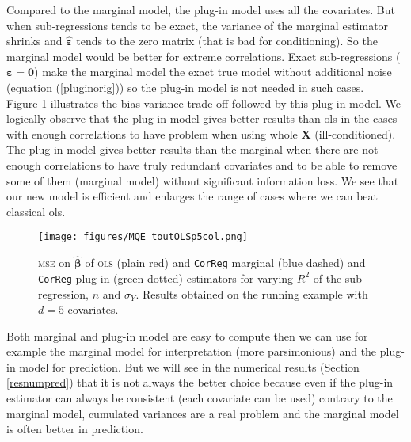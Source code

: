 \documentclass[12pt,a4paper]{report}
\begin{document}
Compared to the marginal model, the plug-in model uses all the covariates. But when sub-regressions tends to be exact, the variance of the marginal estimator shrinks and $ \hat{\boldsymbol{\varepsilon}}$ tends to the zero matrix (that is bad for conditioning). So the marginal model would be better for extreme correlations. 
Exact sub-regressions ($\boldsymbol{\varepsilon}=\boldsymbol{0}$) make the marginal model the exact true model without additional noise (equation (\ref{pluginorig})) so the plug-in model is not needed in such cases.\\
%		

	Figure \ref{MQE2} illustrates the bias-variance trade-off followed by this plug-in model. We logically observe that the plug-in model gives better results than {\sc ols} in the cases with enough correlations to have problem when using whole $\boldsymbol{X}$ (ill-conditioned). The plug-in model gives better results than the marginal when there are not enough correlations to have truly redundant covariates and to be able to remove some of them (marginal model) without significant information loss. We see that our new model is efficient and enlarges the range of cases where we can beat classical {\sc ols}.
\begin{figure}[h!]
\centering
	\texttt{[image: figures/MQE\_toutOLSp5col.png]}
	\caption{\textsc{mse} on $\hat{\boldsymbol{\beta}}$ of \textsc{ols} (plain red) and {\tt CorReg} marginal (blue dashed) and {\tt CorReg} plug-in (green dotted) estimators for varying $R^2$ of the sub-regression, $n$ and $\sigma_Y$. Results obtained on the running example with $d=5$ covariates.}\label{MQE2}
\end{figure}	
			
		Both marginal and plug-in model are easy to compute then we can use for example the marginal model for interpretation (more parsimonious) and the plug-in model for prediction. But we will see in the numerical results (Section \ref{resnumpred}) that it is not always the better choice because even if the plug-in estimator can always be consistent (each covariate can be used) contrary to the marginal model, cumulated variances are a real problem and the marginal model is often better in prediction.
			
\end{document}
